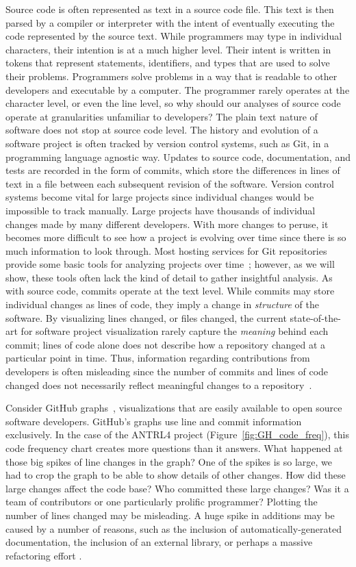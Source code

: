 Source code is often represented as text in a source code file. This text is then parsed by a compiler or interpreter with the intent of eventually executing the code represented by the source text. While programmers may type in individual characters, their intention is at a much higher level. Their intent is written in tokens that represent statements, identifiers, and types that are used to solve their problems. Programmers solve problems in a way that is readable to other developers and executable by a computer. The programmer rarely operates at the character level, or even the line level, so why should our analyses of source code operate at granularities unfamiliar to developers?
The plain text nature of software does not stop at source code level. The history and evolution of a software project is often tracked by version control systems, such as Git, in a programming language agnostic way. Updates to source code, documentation, and tests are recorded in the form of commits, which store the differences in lines of text in a file between each subsequent revision of the software. Version control systems become vital for large projects since individual changes would be impossible to track manually. Large projects have thousands of individual changes made by many different developers. With more changes to peruse, it becomes more difficult to see how a project is evolving over time since there is so much information to look through. Most hosting services for Git repositories provide some basic tools for analyzing projects over time~\cite{github-graphs,bitbucket-graphs}; however, as we will show, these tools often lack the kind of detail to gather insightful analysis. As with source code, commits operate at the text level. While commits may store individual changes as lines of code, they imply a change in \emph{structure} of the software.  By visualizing lines changed, or files changed, the current state-of-the-art for software project visualization rarely capture the \emph{meaning} behind each commit; lines of code alone does not describe how a repository changed at a particular point in time. Thus, information regarding contributions from developers is often misleading since the number of commits and lines of code changed does not necessarily reflect meaningful changes to a repository~\cite{robles2014}.

Consider GitHub graphs~\cite{github-graphs}, visualizations that are easily available to open source software developers. GitHub's graphs use line and commit information exclusively. In the case of the ANTRL4 project (Figure~\ref{fig:GH_code_freq}), this code frequency chart creates more questions than it answers. What happened at those big spikes of line changes in the graph? One of the spikes is so large, we had to crop the graph to be able to show details of other changes. How did these large changes affect the code base? Who committed these large changes? Was it a team of contributors or one particularly prolific programmer? Plotting the number of lines changed may be misleading. A huge spike in additions may be caused by a number of reasons, such as the inclusion of automatically-generated documentation, the inclusion of an external library, or perhaps a massive refactoring effort \cite{Hindle:2008:LCT:1370750.1370773}.


